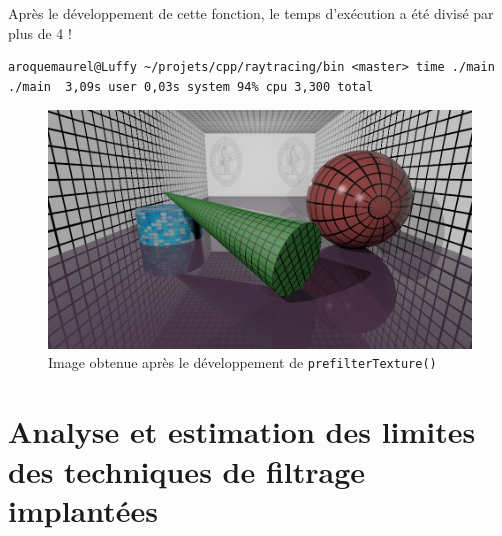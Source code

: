 \documentclass[a4paper, 11pt]{article}
\begin{document}
	Après le développement de cette fonction, le temps d'exécution a été divisé par plus de 4 ! 
\begin{lstlisting}[language=Sh]
aroquemaurel@Luffy ~/projets/cpp/raytracing/bin <master> time ./main
./main  3,09s user 0,03s system 94% cpu 3,300 total
\end{lstlisting}
	\begin{figure}[H]
		\centering
		\includegraphics[width=12cm]{3-monimage.png}
		\caption{Image obtenue après le développement de \texttt{prefilterTexture()}}
		\label{fig:fig1}
	\end{figure}

	\section{Analyse et estimation des limites des techniques de filtrage implantées}
\end{document}
